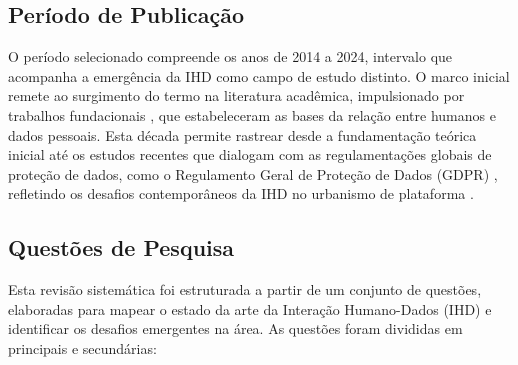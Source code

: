 \documentclass[12pt]{article}
\begin{document}

\subsection{Período de Publicação}

   O período selecionado compreende os anos de 2014 a 2024, intervalo que acompanha a emergência da IHD como campo de estudo distinto. O marco inicial remete ao surgimento do termo na literatura acadêmica, impulsionado por trabalhos fundacionais \cite{mortier2015humandatainteractionhumanface,Hornung2015}, que estabeleceram as bases da relação entre humanos e dados pessoais. Esta década permite rastrear desde a fundamentação teórica inicial até os estudos recentes que dialogam com as regulamentações globais de proteção de dados, como o Regulamento Geral de Proteção de Dados (GDPR) \cite{gdpr2016}, refletindo os desafios contemporâneos da IHD no urbanismo de plataforma \cite{Belizario2023Interacao,chalhoub2024useful,coleti2024grandihc}.

\subsection{Questões de Pesquisa}

 Esta revisão sistemática foi estruturada a partir de um conjunto de questões, elaboradas para mapear o estado da arte da Interação Humano-Dados (IHD) e identificar os desafios emergentes na área. As questões foram divididas em principais e secundárias:
\end{document}
